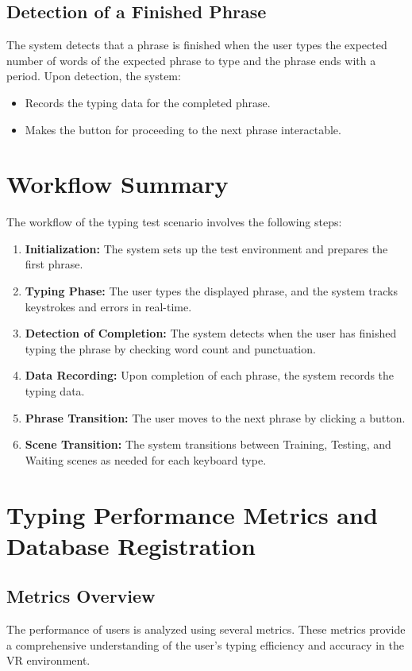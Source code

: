 \subsection{Detection of a Finished Phrase}
The system detects that a phrase is finished when the user types the expected number of words of the expected phrase to type and the phrase ends with a period. Upon detection, the system:
\begin{itemize}
    \item Records the typing data for the completed phrase.
    \item Makes the button for proceeding to the next phrase interactable.
\end{itemize}

\section{Workflow Summary}
The workflow of the typing test scenario involves the following steps:
\begin{enumerate}
    \item \textbf{Initialization:} The system sets up the test environment and prepares the first phrase.
    \item \textbf{Typing Phase:} The user types the displayed phrase, and the system tracks keystrokes and errors in real-time.
    \item \textbf{Detection of Completion:} The system detects when the user has finished typing the phrase by checking word count and punctuation.
    \item \textbf{Data Recording:} Upon completion of each phrase, the system records the typing data.
    \item \textbf{Phrase Transition:} The user moves to the next phrase by clicking a button.
    \item \textbf{Scene Transition:} The system transitions between Training, Testing, and Waiting scenes as needed for each keyboard type.
\end{enumerate}



\section{Typing Performance Metrics and Database Registration}

\subsection{Metrics Overview}
The performance of users is analyzed using several metrics. These metrics provide a comprehensive understanding of the user's typing efficiency and accuracy in the VR environment.

